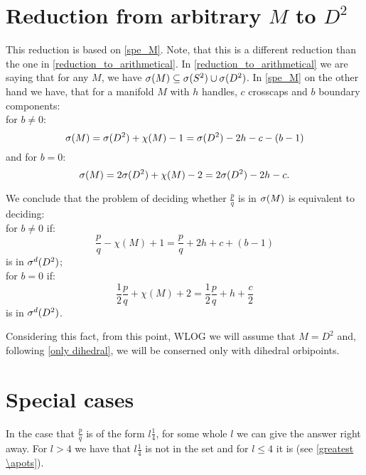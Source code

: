 \section{Reduction from arbitrary $M$ to $D^2$}
This reduction is based on \ref{spe_M}.
Note, that this is a different reduction than the one in \ref{reduction_to_arithmetical}. 
In \ref{reduction_to_arithmetical} we are saying that for any $M$, we have ${{\sigma}(M)} 
\subseteq {{\sigma}(S^2)} \cup {{\sigma}(D^2)}$. In \ref{spe_M} on the other hand we have, that 
for a manifold $M$ with $h$ handles, $c$ crosscaps and $b$ boundary components: \\
for $b \neq 0$:
\begin{equation}
{\sigma}(M) = {{\sigma}(D^2)} + \chi(M) -1 = {{\sigma}(D^2)} - 2h - c - (b - 1)
\end{equation}
and for $b = 0$:
\begin{equation}
{\sigma}(M) = 2{{\sigma}(D^2)} + \chi(M) - 2 = 2{{\sigma}(D^2)} - 2h - c.
\end{equation}  


We conclude that the problem of deciding whether $\frac{p}{q}$ is in ${\sigma}(M)$
is equivalent to deciding: \\
for $b \neq 0$ if:
\begin{equation}\label{translation with b not 0}
\frac{p}{q} - \chi(M) + 1 = \frac{p}{q} + 2h + c + (b-1) 
\end{equation} 
is in ${\sigma^d(D^2)}$; \\
for $b = 0$ if:
\begin{equation}\label{translation with b 0}
\frac{1}{2}\frac{p}{q} + \chi(M) + 2 = \frac{1}{2}\frac{p}{q}+h+\frac{c}{2}
\end{equation}
is in ${\sigma^d(D^2)}$.

Considering this fact, from this point, WLOG we will assume that $M = D^2$ and, 
following \ref{only dihedral}, we will 
be conserned only with dihedral orbipoints.


\section{Special cases}
In the case that $\frac{p}{q}$ is of the form $l\frac{1}{4}$, for some whole $l$ 
we can give the answer right away. For $l > 4$ we have that $l\frac{1}{4}$ is not in the set 
and for $l \leq 4$ it is (see \ref{greatest \apots}). 

